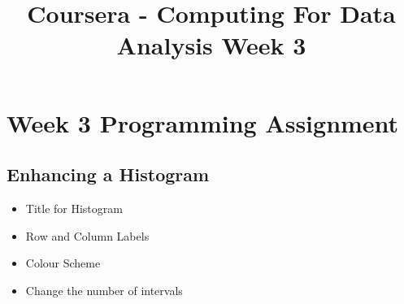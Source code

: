 \documentclass[]{article}
\title{Coursera - Computing For Data Analysis Week 3}
\begin{document}
\maketitle



\section{Week 3 Programming Assignment}
\subsection{Enhancing a Histogram}
\begin{itemize}
\item Title for Histogram
\item Row and Column Labels
\item Colour Scheme
\item Change the number of intervals
\end{itemize}
\end{document}
